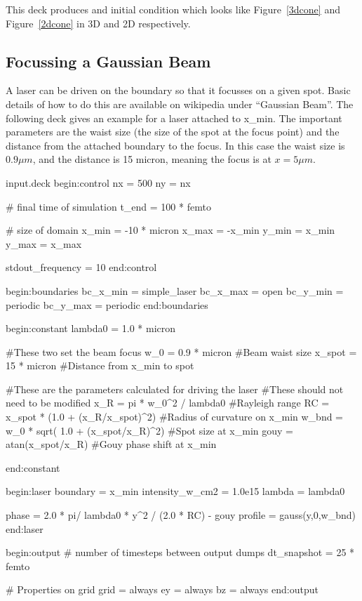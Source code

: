 
This deck produces and initial condition which looks like Figure~\ref{3dcone}
and Figure~\ref{2dcone} in 3D and 2D respectively.

\subsection{Focussing a Gaussian Beam}\label{sec:focus_eg}
A laser can be driven on the boundary so that it focusses on a given spot.
Basic details of how to do this are available on wikipedia under
``Gaussian Beam''. The following deck gives an example for a laser attached
to x\_min. The important parameters are the waist size (the size of the spot
at the focus point) and the distance from the attached boundary to the focus.
In this case the waist size is $0.9\mu m$, and the distance is 15 micron,
meaning the focus is at $x = 5\mu m$.

\begin{lboxverbatim}{input.deck}
begin:control
  nx = 500
  ny = nx

  # final time of simulation
  t_end = 100 * femto

  # size of domain
  x_min = -10 * micron
  x_max = -x_min
  y_min = x_min
  y_max = x_max

  stdout_frequency = 10
end:control

begin:boundaries
  bc_x_min = simple_laser
  bc_x_max = open
  bc_y_min = periodic
  bc_y_max = periodic
end:boundaries

begin:constant
  lambda0 = 1.0 * micron

  #These two set the beam focus
  w_0 = 0.9 * micron #Beam waist size
  x_spot = 15 * micron #Distance from x_min to spot

  #These are the parameters calculated for driving the laser
  #These should not need to be modified
  x_R = pi * w_0^2 / lambda0 #Rayleigh range
  RC = x_spot * (1.0 + (x_R/x_spot)^2) #Radius of curvature on x_min
  w_bnd = w_0 * sqrt( 1.0 + (x_spot/x_R)^2) #Spot size at x_min
  gouy = atan(x_spot/x_R) #Gouy phase shift at x_min

end:constant

begin:laser
  boundary = x_min
  intensity_w_cm2 = 1.0e15
  lambda = lambda0

  phase = 2.0 * pi/ lambda0 * y^2 / (2.0 * RC) - gouy
  profile = gauss(y,0,w_bnd)
end:laser

begin:output
  # number of timesteps between output dumps
  dt_snapshot = 25 * femto

  # Properties on grid
  grid = always
  ey = always
  bz = always
end:output
\end{lboxverbatim}

